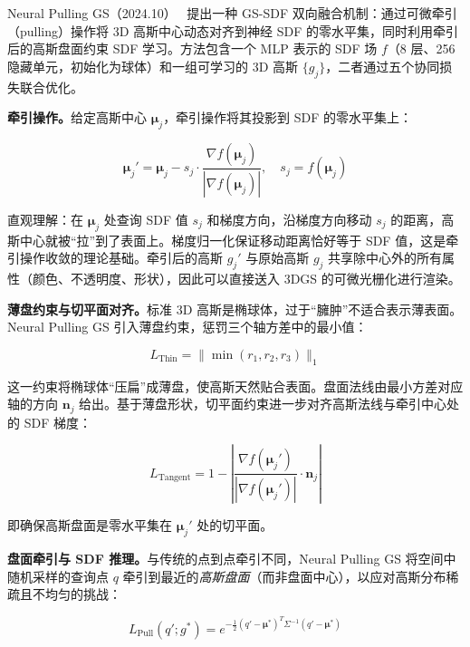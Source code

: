 Neural Pulling GS（2024.10）~\cite{2410_14189} 提出一种 GS-SDF 双向融合机制：通过可微牵引（pulling）操作将 3D 高斯中心动态对齐到神经 SDF 的零水平集，同时利用牵引后的高斯盘面约束 SDF 学习。方法包含一个 MLP 表示的 SDF 场 $f$（8 层、256 隐藏单元，初始化为球体）和一组可学习的 3D 高斯 $\{g_j\}$，二者通过五个协同损失联合优化。

\textbf{牵引操作。}给定高斯中心 $\boldsymbol{\mu}_j$，牵引操作将其投影到 SDF 的零水平集上：

\begin{equation}
\boldsymbol{\mu}_j' = \boldsymbol{\mu}_j - s_j \cdot \frac{\nabla f(\boldsymbol{\mu}_j)}{|\nabla f(\boldsymbol{\mu}_j)|}, \quad s_j = f(\boldsymbol{\mu}_j)
\end{equation}

直观理解：在 $\boldsymbol{\mu}_j$ 处查询 SDF 值 $s_j$ 和梯度方向，沿梯度方向移动 $s_j$ 的距离，高斯中心就被“拉”到了表面上。梯度归一化保证移动距离恰好等于 SDF 值，这是牵引操作收敛的理论基础。牵引后的高斯 $g_j'$ 与原始高斯 $g_j$ 共享除中心外的所有属性（颜色、不透明度、形状），因此可以直接送入 3DGS 的可微光栅化进行渲染。

\textbf{薄盘约束与切平面对齐。}标准 3D 高斯是椭球体，过于“臃肿”不适合表示薄表面。Neural Pulling GS 引入薄盘约束，惩罚三个轴方差中的最小值：

\begin{equation}
L_\text{Thin} = \|\min(r_1, r_2, r_3)\|_1
\end{equation}

这一约束将椭球体“压扁”成薄盘，使高斯天然贴合表面。盘面法线由最小方差对应轴的方向 $\mathbf{n}_j$ 给出。基于薄盘形状，切平面约束进一步对齐高斯法线与牵引中心处的 SDF 梯度：

\begin{equation}
L_\text{Tangent} = 1 - \left|\frac{\nabla f(\boldsymbol{\mu}_j')}{|\nabla f(\boldsymbol{\mu}_j')|} \cdot \mathbf{n}_j\right|
\end{equation}

即确保高斯盘面是零水平集在 $\boldsymbol{\mu}_j'$ 处的切平面。

\textbf{盘面牵引与 SDF 推理。}与传统的点到点牵引不同，Neural Pulling GS 将空间中随机采样的查询点 $q$ 牵引到最近的\emph{高斯盘面}（而非盘面中心），以应对高斯分布稀疏且不均匀的挑战：

\begin{equation}
L_\text{Pull}(q'; g^*) = e^{-\frac{1}{2}(q'-\boldsymbol{\mu}^*)^T \Sigma^{-1} (q'-\boldsymbol{\mu}^*)}
\end{equation}

